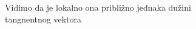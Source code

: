 \documentclass[preview]{standalone}
\begin{document}
\begin{center}
Vidimo da je lokalno ona približno jednaka dužini\\ tangnentnog vektora
\end{center}
\end{document}
